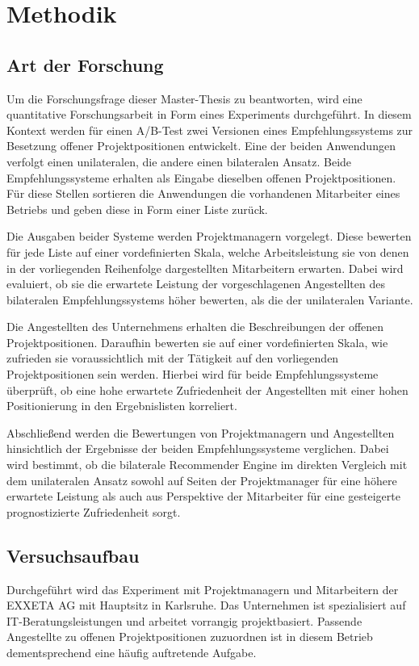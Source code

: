\chapter{Methodik}
\label{ch:methodik}

\section{Art der Forschung}
\label{ch:methodik:art}
Um die Forschungsfrage dieser Master-Thesis zu beantworten, wird eine quantitative Forschungsarbeit in Form eines Experiments durchgeführt. In diesem Kontext werden für einen A/B-Test zwei Versionen eines Empfehlungssystems zur Besetzung offener Projektpositionen entwickelt. Eine der beiden Anwendungen verfolgt einen unilateralen, die andere einen bilateralen Ansatz. Beide Empfehlungssysteme erhalten als Eingabe dieselben offenen Projektpositionen. Für diese Stellen sortieren die Anwendungen die vorhandenen Mitarbeiter eines Betriebs und geben diese in Form einer Liste zurück.

Die Ausgaben beider Systeme werden Projektmanagern vorgelegt. Diese bewerten für jede Liste auf einer vordefinierten Skala, welche Arbeitsleistung sie von denen in der vorliegenden Reihenfolge dargestellten Mitarbeitern erwarten. Dabei wird evaluiert, ob sie die erwartete Leistung der vorgeschlagenen Angestellten des bilateralen Empfehlungssystems höher bewerten, als die der unilateralen Variante.

Die Angestellten des Unternehmens erhalten die Beschreibungen der offenen Projektpositionen. Daraufhin bewerten sie auf einer vordefinierten Skala, wie zufrieden sie voraussichtlich mit der Tätigkeit auf den vorliegenden Projektpositionen sein werden. Hierbei wird für beide Empfehlungssysteme überprüft, ob eine hohe erwartete Zufriedenheit der Angestellten mit einer hohen Positionierung in den Ergebnislisten korreliert.

Abschließend werden die Bewertungen von Projektmanagern und Angestellten hinsichtlich der Ergebnisse der beiden Empfehlungssysteme verglichen. Dabei wird bestimmt, ob die bilaterale Recommender Engine im direkten Vergleich mit dem unilateralen Ansatz sowohl auf Seiten der Projektmanager für eine höhere erwartete Leistung als auch aus Perspektive der Mitarbeiter für eine gesteigerte prognostizierte Zufriedenheit sorgt.

\section{Versuchsaufbau}
\label{ch:methodik:versuchsaufbau}
Durchgeführt wird das Experiment mit Projektmanagern und Mitarbeitern der EXXETA AG mit Hauptsitz in Karlsruhe. Das Unternehmen ist spezialisiert auf IT-Beratungsleistungen und arbeitet vorrangig projektbasiert. Passende Angestellte zu offenen Projektpositionen zuzuordnen ist in diesem Betrieb dementsprechend eine häufig auftretende Aufgabe.%


